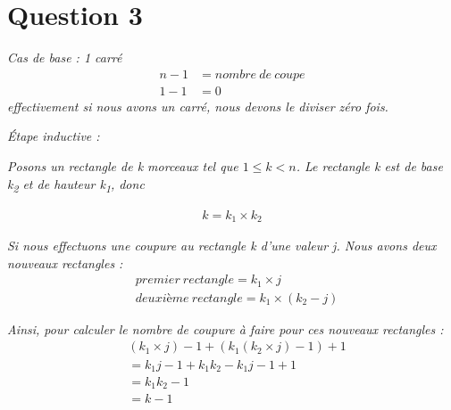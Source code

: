 \section*{Question 3}
\noindent
\emph{Cas de base : 1 carré }
\begin{align*}
	n - 1 &= nombre\ de\ coupe\\
	1 - 1 &= 0
\end{align*}
\noindent
\emph{effectivement si nous avons un carré, nous devons le diviser zéro fois.}

\bigskip
\noindent
\emph{Étape inductive : }

\noindent
\emph{Posons un rectangle de k morceaux tel que $ 1 \leq k < n$. Le rectangle k est de base k\textsubscript{2} et de hauteur k\textsubscript{1}, donc}

\begin{align*}
k = k_1 \times k_2
\end{align*}

\noindent
\emph{Si nous effectuons une coupure au rectangle k d'une valeur j. Nous avons deux nouveaux rectangles :}
\begin{align*}
&premier\ rectangle = k_1 \times j\\
&deuxième\ rectangle = k_1 \times (k_2 - j)
\end{align*}

\noindent
\emph{Ainsi, pour calculer le nombre de coupure à faire pour ces nouveaux rectangles : }
\begin{align*}
&(k_1 \times j) - 1 + (k_1(k_2 \times j)-1) + 1\\
&= k_1 j - 1 + k_1 k_2 - k_1 j - 1 + 1\\
&= k_1 k_2 - 1\\
&= k - 1
\end{align*}